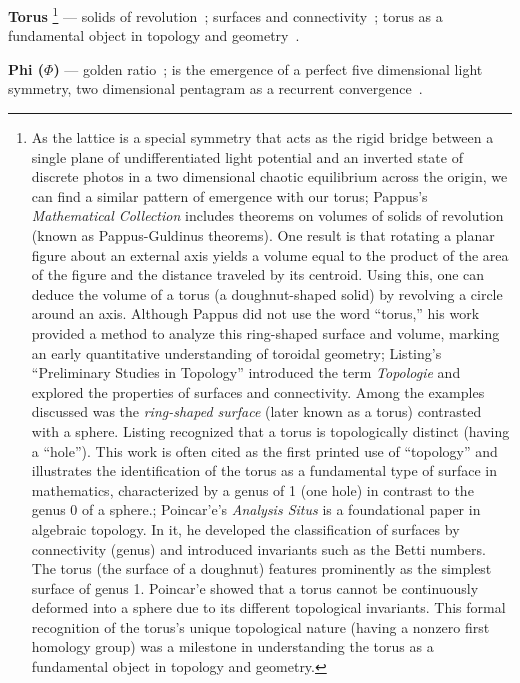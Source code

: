 \documentclass[11pt]{article}
\begin{document}
\textbf{Torus}\label{def:torus}
\footnote{As the lattice is a special symmetry that acts as the rigid bridge between a single plane of undifferentiated light potential and an inverted state of discrete photos in a two dimensional chaotic equilibrium across the origin, we can find a similar pattern of emergence with our torus; Pappus's \emph{Mathematical Collection} includes theorems on volumes of solids of revolution (known as Pappus-Guldinus theorems). One result is that rotating a planar figure about an external axis yields a volume equal to the product of the area of the figure and the distance traveled by its centroid. Using this, one can deduce the volume of a torus (a doughnut-shaped solid) by revolving a circle around an axis. Although Pappus did not use the word “torus,” his work provided a method to analyze this ring-shaped surface and volume, marking an early quantitative understanding of toroidal geometry; Listing's “Preliminary Studies in Topology” introduced the term \textit{Topologie} and explored the properties of surfaces and connectivity. Among the examples discussed was the \textit{ring-shaped surface} (later known as a torus) contrasted with a sphere. Listing recognized that a torus is topologically distinct (having a “hole”). This work is often cited as the first printed use of “topology” and illustrates the identification of the torus as a fundamental type of surface in mathematics, characterized by a genus of 1 (one hole) in contrast to the genus 0 of a sphere.; Poincar'e's \textit{Analysis Situs} is a foundational paper in algebraic topology. In it, he developed the classification of surfaces by connectivity (genus) and introduced invariants such as the Betti numbers. The torus (the surface of a doughnut) features prominently as the simplest surface of genus 1. Poincar'e showed that a torus cannot be continuously deformed into a sphere due to its different topological invariants. This formal recognition of the torus's unique topological nature (having a nonzero first homology group) was a milestone in understanding the torus as a fundamental object in topology and geometry.} 
--- solids of revolution~\cite{Pappus1878}; surfaces and connectivity~\cite{Listing1847}; torus as a fundamental object in topology and geometry~\cite{Poincare1895}.
\newpage

\textbf{Phi (\( \Phi \))}\label{def:phi} --- golden ratio~\cite{Euclid1956}; is the emergence of a perfect five dimensional light~\cite{Pacioli1509} symmetry, two dimensional pentagram as a recurrent convergence~\cite{Kepler1619}.
    
\end{document}
